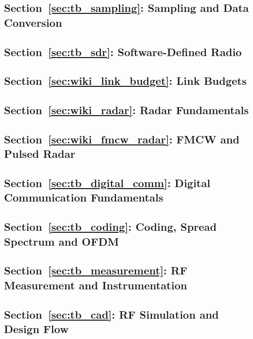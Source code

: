 
\subsection*{Section~\ref{sec:tb_sampling}: Sampling and Data Conversion}

\subsection*{Section~\ref{sec:tb_sdr}: Software-Defined Radio}

\subsection*{Section~\ref{sec:wiki_link_budget}: Link Budgets}

\subsection*{Section~\ref{sec:wiki_radar}: Radar Fundamentals}

\subsection*{Section~\ref{sec:wiki_fmcw_radar}: FMCW and Pulsed Radar}

\subsection*{Section~\ref{sec:tb_digital_comm}: Digital Communication Fundamentals}

\subsection*{Section~\ref{sec:tb_coding}: Coding, Spread Spectrum and OFDM}

\subsection*{Section~\ref{sec:tb_measurement}: RF Measurement and Instrumentation}

\subsection*{Section~\ref{sec:tb_cad}: RF Simulation and Design Flow}
